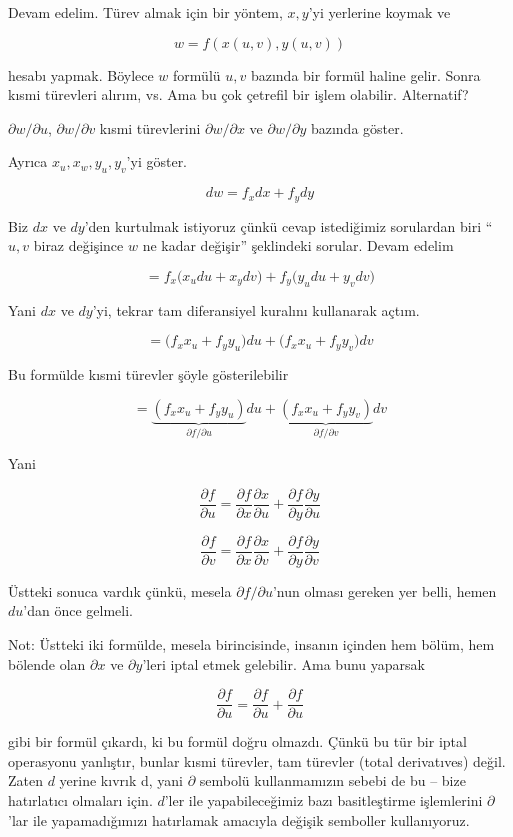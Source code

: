 \documentclass[12pt,fleqn]{article}\usepackage{../../common}
\begin{document}
Devam edelim. Türev almak için bir yöntem, $x,y$'yi yerlerine koymak ve

$$ w = f(x(u,v),y(u,v)) $$

hesabı yapmak. Böylece $w$ formülü $u,v$ bazında bir formül haline
gelir. Sonra kısmi türevleri alırım, vs. Ama bu çok çetrefil bir işlem
olabilir. Alternatif?

$\partial w/\partial u$, $\partial w/\partial v$ kısmi türevlerini
$\partial w/\partial x$ ve $\partial w/\partial y$ bazında göster.

Ayrıca $x_u, x_w, y_u, y_v$'yi göster. 

$$ dw =  f_xdx + f_y dy$$

Biz $dx$ ve $dy$'den kurtulmak istiyoruz çünkü cevap istediğimiz sorulardan
biri ``$u,v$ biraz değişince $w$ ne kadar değişir'' şeklindeki
sorular. Devam edelim

$$ = f_x \bigg( x_u du + x_y dv \bigg) + 
f_y \bigg( y_u du + y_v dv \bigg) $$

Yani $dx$ ve $dy$'yi, tekrar tam diferansiyel kuralını kullanarak açtım. 

$$ = \bigg(f_x x_u + f_yy_u \bigg)du  + 
\bigg(f_xx_u + f_yy_v \bigg) dv $$

Bu formülde kısmi türevler şöyle gösterilebilir

$$ = 
\underbrace{(f_x x_u + f_yy_u )}_{\partial f/\partial u}du  + 
\underbrace{(f_xx_u + f_yy_v)}_{\partial f/\partial v}dv
$$

Yani

$$ \frac{\partial f}{\partial u} = 
\frac{\partial f}{\partial x}\frac{\partial x}{\partial u} +
\frac{\partial f}{\partial y}\frac{\partial y}{\partial u} 
$$

$$ \frac{\partial f}{\partial v} = 
\frac{\partial f}{\partial x}\frac{\partial x}{\partial v} +
\frac{\partial f}{\partial y}\frac{\partial y}{\partial v} 
$$

Üstteki sonuca vardık çünkü, mesela $\partial f/\partial u$'nun olması gereken 
yer belli, 
hemen $du$'dan önce gelmeli.

Not: Üstteki iki formülde, mesela birincisinde, insanın içinden hem bölüm,
hem bölende olan $\partial x$ ve $\partial y$'leri iptal etmek
gelebilir. Ama bunu yaparsak

$$ \frac{\partial f}{\partial u} = 
\frac{\partial f}{\partial u} + \frac{\partial f}{\partial u} 
$$

gibi bir formül çıkardı, ki bu formül doğru olmazdı. Çünkü bu tür bir iptal
operasyonu yanlıştır, bunlar kısmi türevler, tam türevler (total
derivatıves) değil. Zaten $d$ yerine kıvrık d, yani $\partial$ sembolü
kullanmamızın sebebi de bu -- bize hatırlatıcı olmaları için. $d$'ler ile
yapabileceğimiz bazı basitleştirme işlemlerini $\partial$'lar ile
yapamadığımızı hatırlamak amacıyla değişik semboller kullanıyoruz. 
\end{document}
